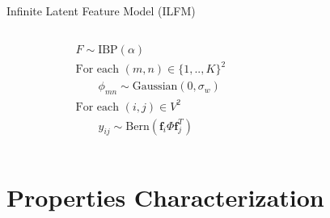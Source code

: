 \begin{frame}

    Infinite Latent Feature Model (ILFM) 
    \vspace{1cm}

    \begin{columns}[t]
        \begin{column}{0.5\textwidth}
            \vspace{-4cm}
            \begin{align*}
                &F \sim \textrm{IBP}(\alpha)\\
                &\textrm{For each }  (m,n) \in \{1,..,K\}^2 \\
                &\qquad\phi_{mn} \sim \mathrm{Gaussian}(0,\sigma_w)\\
                &\textrm{For each } (i,j) \in V^2 \\
                &\qquad y_{ij} \sim \mathrm{Bern}(\bm{f}_i \Phi \bm{f}_j^T)
            \end{align*}
        \end{column}
        \begin{column}{0.5\textwidth}
            \scalebox{0.88}{}
        \end{column}
    \end{columns}
\end{frame}

\section{Properties Characterization}

